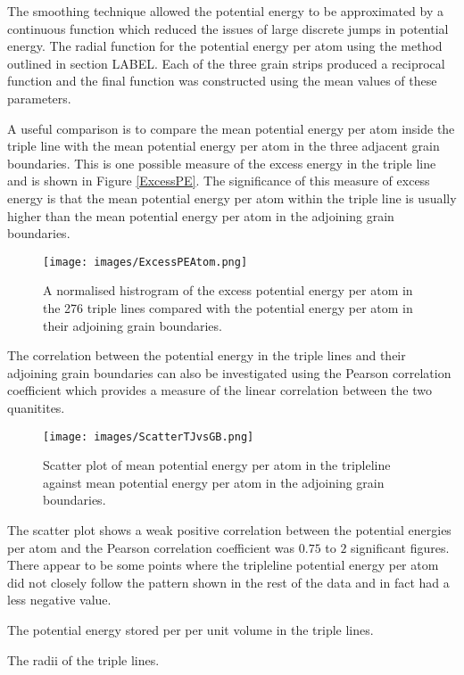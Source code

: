 \documentclass[12pt,a4paper]{book}
\begin{document}
The smoothing technique allowed the potential energy to be approximated by a continuous function which reduced the issues of large discrete jumps in potential energy. The radial function for the potential energy per atom using the method outlined in section LABEL. Each of the three grain strips produced a reciprocal function and the final function was constructed using the mean values of these parameters. 


A useful comparison is to compare the mean potential energy per atom inside the triple line with the mean potential energy per atom in the three adjacent grain boundaries. This is one possible measure of the excess energy in the triple line and is shown in Figure \ref{ExcessPE}. The significance of this measure of excess energy is that the mean potential energy per atom within the triple line is usually higher than the mean potential energy per atom in the adjoining grain boundaries.

\begin{figure}[H]
	\texttt{[image: images/ExcessPEAtom.png]} 
	\label{fig:ExcessPE}
	\caption{A normalised histrogram of the excess potential energy per atom in the 276 triple lines compared with the potential energy per atom in their adjoining grain boundaries.}
\end{figure}

The correlation between the potential energy in the triple lines and their adjoining grain boundaries can also be investigated using the Pearson correlation coefficient which provides a measure of the linear correlation between the two quanitites.

\begin{figure}[H]
	\texttt{[image: images/ScatterTJvsGB.png]} 
	\label{fig:ScatterTJvsGB}
	\caption{Scatter plot of mean potential energy per atom in the tripleline against mean potential energy per atom in the adjoining grain boundaries.}
\end{figure}

The scatter plot shows a weak positive correlation between the potential energies per atom and the Pearson correlation coefficient was $0.75$ to $2$ significant figures. There appear to be some points where the tripleline potential energy per atom did not closely follow the pattern shown in the rest of the data and in fact had a less negative value. 

The potential energy stored per per unit volume in the triple lines.

The radii of the triple lines.
\end{document}
